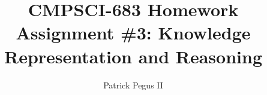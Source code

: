 \documentclass[12pt]{article}
\newenvironment{problem}[2][Problem]{\begin{trivlist}
\item[\hskip \labelsep {\bfseries #1}\hskip \labelsep {\bfseries #2.}]}{\end{trivlist}}
\begin{document}

\title{CMPSCI-683 Homework Assignment \#3: Knowledge Representation and Reasoning}
\author{Patrick Pegus II}
\maketitle

\begin{problem}{1}
\end{problem}
\end{document}

